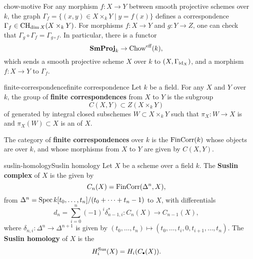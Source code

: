\begin{example}{chow-motive}
    For any morphism $f : X \to Y$ between smooth projective schemes over $k$, the graph $\Gamma_f = \{ (x, y) \in X \times_k Y \mid y = f(x) \}$ defines a correspondence $\Gamma_f \in \textup{CH}_{\dim X}(X \times_k Y)$. For morphisms $f : X \to Y$ and $g : Y \to Z$, one can check that $\Gamma_g \circ \Gamma_f =\Gamma_{g \circ f}$. In particular, there is a functor
    \[ \textbf{SmProj}_k \to \textup{Chow}^\textup{eff}(k) , \]
    which sends a smooth projective scheme $X$ over $k$ to $(X, \Gamma_{\textup{id}_X})$, and a morphism $f : X \to Y$ to $\Gamma_f$.
\end{example}

\begin{topic}{finite-correspondence}{finite correspondence}
    Let $k$ be a field. For any  $X$ and $Y$ over $k$, the group of \textbf{finite correspondences} from $X$ to $Y$ is the subgroup
    \[ C(X, Y) \subset Z(X \times_k Y) \]
    of  generated by integral closed subschemes $W \subset X \times_k Y$ such that $\pi_X : W \to X$ is  and $\pi_X(W) \subset X$ is an  of $X$.
    
    The category of \textbf{finite correspondences} over $k$ is the  $\textup{FinCorr}(k)$ whose objects are   over $k$, and whose morphisms from $X$ to $Y$ are given by $C(X, Y)$.
\end{topic}

\begin{topic}{suslin-homology}{Suslin homology}
    Let $X$ be a  scheme over a field $k$. The \textbf{Suslin complex} of $X$ is the  given by 
    \[ C_n(X) = \textup{FinCorr}(\Delta^n, X) , \]
    from $\Delta^n = \operatorname{Spec} k[t_0, \ldots, t_n] / (t_0 + \cdots + t_n - 1)$ to $X$, with differentials
    \[ d_n = \sum_{i = 0}^{n} (-1)^i \delta_{n - 1, i}^* : C_n(X) \to C_{n - 1}(X) , \]
    where $\delta_{n, i} : \Delta^n \to \Delta^{n + 1}$ is given by $(t_0, \ldots, t_n) \mapsto (t_0, \ldots, t_i, 0, t_{i + 1}, \ldots, t_n)$.
    The \textbf{Suslin homology} of $X$ is the 
    \[ H^\textup{Sus}_i(X) = H_i(C_\bdot(X)) . \]
\end{topic}

